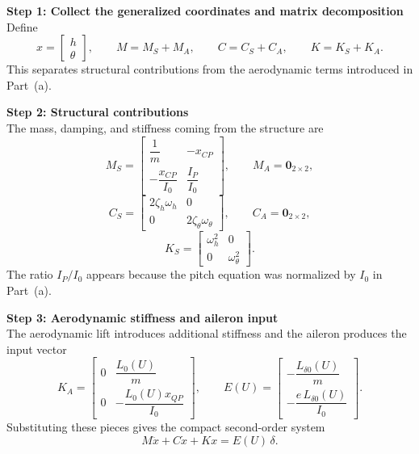 \documentclass[12pt]{article}
\begin{document}
\begin{stepbox}
\textbf{Step 1: Collect the generalized coordinates and matrix decomposition}\\[0.5em]
Define
\[
  x = \begin{bmatrix} h \\ \theta \end{bmatrix}, \qquad
  M = M_S + M_A, \qquad
  C = C_S + C_A, \qquad
  K = K_S + K_A.
\]
This separates structural contributions from the aerodynamic terms introduced in Part~(a).
\end{stepbox}

\begin{stepbox}
\textbf{Step 2: Structural contributions}\\[0.5em]
The mass, damping, and stiffness coming from the structure are
\[
  M_S = \begin{bmatrix} \dfrac{1}{m} & -x_{CP} \\[0.4em] -\dfrac{x_{CP}}{I_0} & \dfrac{I_P}{I_0} \end{bmatrix}, \qquad
  M_A = \mathbf{0}_{2\times 2},
\]
\[
  C_S = \begin{bmatrix} 2\zeta_h\omega_h & 0 \\ 0 & 2\zeta_\theta\omega_\theta \end{bmatrix}, \qquad
  C_A = \mathbf{0}_{2\times 2},
\]
\[
  K_S = \begin{bmatrix} \omega_h^2 & 0 \\ 0 & \omega_\theta^2 \end{bmatrix}.
\]
The ratio $I_P/I_0$ appears because the pitch equation was normalized by $I_0$ in Part~(a).
\end{stepbox}

\begin{stepbox}
\textbf{Step 3: Aerodynamic stiffness and aileron input}\\[0.5em]
The aerodynamic lift introduces additional stiffness and the aileron produces the input vector
\[
  K_A = \begin{bmatrix} 0 & \dfrac{L_0(U)}{m} \\[0.4em] 0 & -\dfrac{L_0(U) x_{QP}}{I_0} \end{bmatrix}, \qquad
  E(U) = \begin{bmatrix} -\dfrac{L_{\delta 0}(U)}{m} \\[0.6em] -\dfrac{e\,L_{\delta 0}(U)}{I_0} \end{bmatrix}.
\]
Substituting these pieces gives the compact second-order system
\[
  M\ddot{x} + C\dot{x} + K x = E(U)\,\delta.
\]
\end{stepbox}
\end{document}
